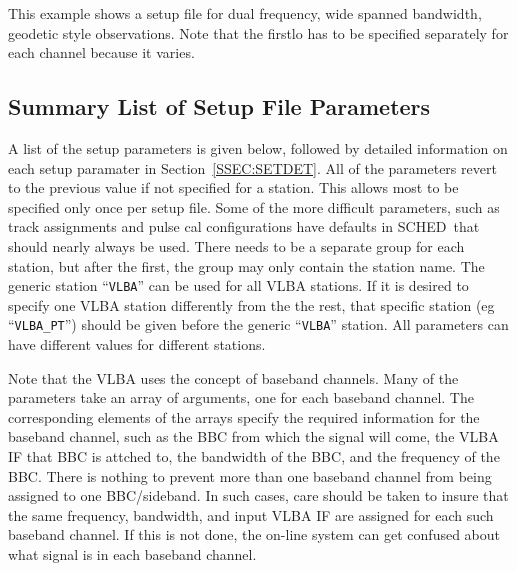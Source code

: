 \documentclass{report}
\newcommand{\schedb}{{\sc SCHED~}}
\begin{document}
\newpage

This example shows a setup file for dual frequency, wide spanned
bandwidth, geodetic style observations.  Note that the firstlo
has to be specified separately for each channel because it varies.




\subsection{\label{SSEC:SETLST}Summary List of Setup File Parameters}

A list of the setup parameters is given below, followed by detailed
information on each setup paramater in Section~\ref{SSEC:SETDET}. All
of the parameters revert to the previous value if not specified for a
station. This allows most to be specified only once per setup file.
Some of the more difficult parameters, such as track assignments and
pulse cal configurations have defaults in \schedb that should
nearly always be used.  There needs to be a separate group for each
station, but after the first, the group may only contain the station
name.  The generic station ``{\tt VLBA}'' can be used for all VLBA
stations.  If it is desired to specify one VLBA station differently
from the the rest, that specific station (eg ``{\tt VLBA\_PT}'')
should be given before the generic ``{\tt VLBA}'' station.  All
parameters can have different values for different stations.

Note that the VLBA uses the concept of baseband channels.  Many of the
parameters take an array of arguments, one for each baseband
channel. The corresponding elements of the arrays specify the required
information for the baseband channel, such as the BBC from which the
signal will come, the VLBA IF that BBC is attched to, the bandwidth of
the BBC, and the frequency of the BBC. There is nothing to prevent
more than one baseband channel from being assigned to one
BBC/sideband. In such cases, care should be taken to insure that the
same frequency, bandwidth, and input VLBA IF are assigned for each
such baseband channel. If this is not done, the on-line system can get
confused about what signal is in each baseband channel.
\end{document}
